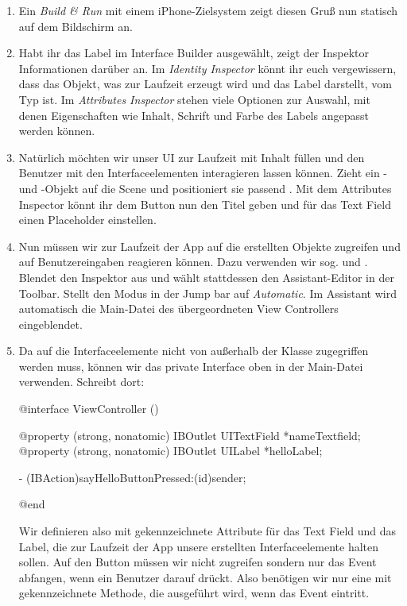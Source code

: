 \documentclass[parskip=half, final]{scrreprt}
\begin{document}
\begin{lecture}
\begin{enumerate}
\item Ein \emph{Build \& Run} mit einem iPhone-Zielsystem zeigt diesen Gruß nun statisch auf dem Bildschirm an.

\item Habt ihr das Label im Interface Builder ausgewählt, zeigt der Inspektor Informationen darüber an. Im \emph{Identity Inspector} könnt ihr euch vergewissern, dass das Objekt, was zur Laufzeit erzeugt wird und das Label darstellt, vom Typ  ist. Im \emph{Attributes Inspector} stehen viele Optionen zur Auswahl, mit denen Eigenschaften wie Inhalt, Schrift und Farbe des Labels angepasst werden können.

\item Natürlich möchten wir unser UI zur Laufzeit mit Inhalt füllen und den Benutzer mit den Interfaceelementen interagieren lassen können. Zieht ein - und -Objekt auf die Scene und positioniert sie passend . Mit dem Attributes Inspector könnt ihr dem Button nun den Titel  geben und für das Text Field einen Placeholder  einstellen.


\item Nun müssen wir zur Laufzeit der App auf die erstellten Objekte zugreifen und auf Benutzereingaben reagieren können. Dazu verwenden wir sog.  und . Blendet den Inspektor aus und wählt stattdessen den Assistant-Editor in der Toolbar. Stellt den Modus in der Jump bar auf \emph{Automatic}. Im Assistant wird automatisch die Main-Datei des übergeordneten View Controllers eingeblendet.

\item Da auf die Interfaceelemente nicht von außerhalb der Klasse zugegriffen werden muss, können wir das private Interface oben in der Main-Datei verwenden. Schreibt dort:
\begin{objclst}
@interface ViewController ()

@property (strong, nonatomic) IBOutlet UITextField *nameTextfield;
@property (strong, nonatomic) IBOutlet UILabel *helloLabel;

- (IBAction)sayHelloButtonPressed:(id)sender;

@end
\end{objclst}
Wir definieren also mit  gekennzeichnete Attribute für das Text Field und das Label, die zur Laufzeit der App unsere erstellten Interfaceelemente halten sollen. Auf den Button müssen wir nicht zugreifen sondern nur das Event abfangen, wenn ein Benutzer darauf drückt. Also benötigen wir nur eine mit  gekennzeichnete Methode, die ausgeführt wird, wenn das Event eintritt.


\end{enumerate}
\end{lecture}
\end{document}
